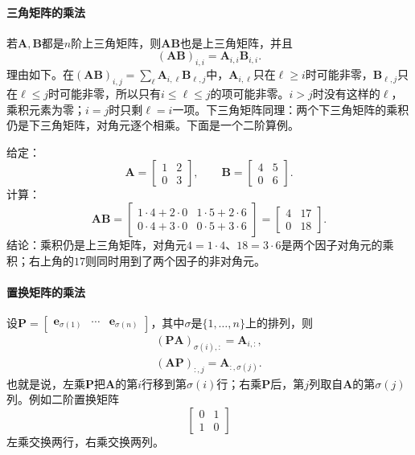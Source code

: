 \paragraph{三角矩阵的乘法}
若$\bm A,\bm B$都是$n$阶上三角矩阵，则$\bm A\bm B$也是上三角矩阵，并且
\[
 (\bm A\bm B)_{i,i}=\bm A_{i,i}\bm B_{i,i}.
\]
理由如下。在$(\bm A\bm B)_{i,j}=\sum_\ell\bm A_{i,\ell}\bm B_{\ell,j}$中，$\bm A_{i,\ell}$只在$\ell\geq i$时可能非零，$\bm B_{\ell,j}$只在$\ell\leq j$时可能非零，所以只有$i\leq\ell\leq j$的项可能非零。$i>j$时没有这样的$\ell$，乘积元素为零；$i=j$时只剩$\ell=i$一项。下三角矩阵同理：两个下三角矩阵的乘积仍是下三角矩阵，对角元逐个相乘。下面是一个二阶算例。
\begin{example}[两个上三角矩阵的乘积]
\label{ex:ls-upper-triangular-product}
给定：
\[
\bm A=\begin{bmatrix}1&2\\0&3\end{bmatrix},\qquad
\bm B=\begin{bmatrix}4&5\\0&6\end{bmatrix}.
\]
计算：
\[
 \bm A\bm B=\begin{bmatrix}1\cdot4+2\cdot0&1\cdot5+2\cdot6\\0\cdot4+3\cdot0&0\cdot5+3\cdot6\end{bmatrix}=\begin{bmatrix}4&17\\0&18\end{bmatrix}.
\]
结论：乘积仍是上三角矩阵，对角元$4=1\cdot4$、$18=3\cdot6$是两个因子对角元的乘积；右上角的$17$则同时用到了两个因子的非对角元。
\end{example}

\paragraph{置换矩阵的乘法}
设$\bm P=\left[\begin{smallmatrix}\bm e_{\sigma(1)}&\cdots&\bm e_{\sigma(n)}\end{smallmatrix}\right]$，其中$\sigma$是$\{1,\ldots,n\}$上的排列，则
\[
 \begin{gathered}
(\bm P\bm A)_{\sigma(i),:}=\bm A_{i,:},\\
(\bm A\bm P)_{:,j}=\bm A_{:,\sigma(j)}.
 \end{gathered}
\]
也就是说，左乘$\bm P$把$\bm A$的第$i$行移到第$\sigma(i)$行；右乘$\bm P$后，第$j$列取自$\bm A$的第$\sigma(j)$列。例如二阶置换矩阵
\[
 \begin{bmatrix}0&1\\1&0\end{bmatrix}
\]
左乘交换两行，右乘交换两列。

